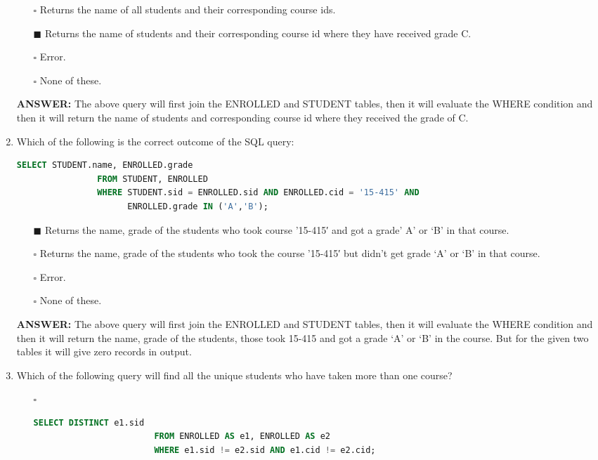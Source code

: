 \documentclass[10pt]{article}
\begin{document}
\begin{enumerate}
			\begin{enumerate}
				\item[$\square$] Returns the name of all students and their corresponding course ids.
				\item[$\blacksquare$] Returns the name of students and their corresponding course id where they have received grade C.
				\item[$\square$] Error.
				\item[$\square$] None of these.
			\end{enumerate}
			\color{red} \textbf{ANSWER:} \color{black} The above query will first join the ENROLLED and STUDENT tables, then it will evaluate the WHERE condition and then it will return the name of students and corresponding course id where they received the grade of C.

		\item Which of the following is the correct outcome of the SQL query: 
			\begin{lstlisting}[language=SQL,firstline=1, lastline=4]
				SELECT STUDENT.name, ENROLLED.grade 
				FROM STUDENT, ENROLLED 
				WHERE STUDENT.sid = ENROLLED.sid AND ENROLLED.cid = '15-415' AND 
				      ENROLLED.grade IN ('A','B');
			\end{lstlisting}

			\begin{enumerate}
				\item[$\blacksquare$] Returns the name, grade of the students who took course ’15-415′ and got a grade’ A’ or ‘B’ in that course.
				\item[$\square$] Returns the name, grade of the students who took the course ’15-415′ but didn’t get grade ‘A’ or ‘B’ in that course.
				\item[$\square$] Error.
				\item[$\square$] None of these.
			\end{enumerate}
			\color{red} \textbf{ANSWER:} \color{black} The above query will first join the ENROLLED and STUDENT tables, then it will evaluate the WHERE condition and then it will return the name, grade of the students, those took 15-415 and got a grade ‘A’ or ‘B’ in the course.  But for the given two tables it will give zero records in output.

		\item Which of the following query will find all the unique students who have taken more than one course?
			\begin{enumerate}
				\item[$\square$] 
					\begin{lstlisting}[language=SQL,firstline=1, lastline=3, numbers = right] 
						SELECT DISTINCT e1.sid 
						FROM ENROLLED AS e1, ENROLLED AS e2 
						WHERE e1.sid != e2.sid AND e1.cid != e2.cid;
					\end{lstlisting}


\end{enumerate}
\end{enumerate}
\end{document}
